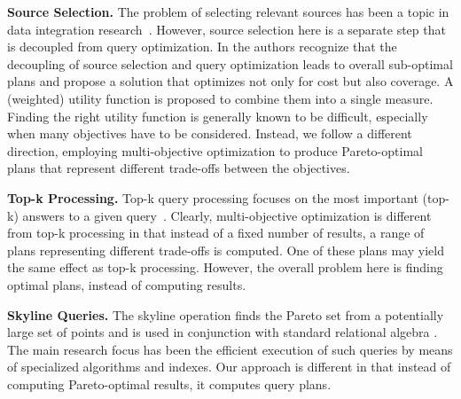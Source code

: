 \textbf{Source Selection.} The problem of selecting relevant sources
has been a topic in data integration research~\cite{levy_querying_1996}. 
However, 
source selection here is a separate step that is decoupled from query
optimization. In \cite{nie_joint_2001} the authors recognize that the decoupling of
source selection and query optimization leads to overall sub-optimal
plans and propose a solution that optimizes not only for cost but
also coverage. A (weighted) utility function is proposed to combine them 
into a single measure. 
Finding the right utility function is generally known to be difficult, especially when many objectives have to be considered. Instead, we follow a different direction, employing multi-objective optimization to produce Pareto-optimal plans that represent different trade-offs between the objectives.

\textbf{Top-k Processing.} Top-k query processing focuses on the most important (top-k) answers to a
given query~\cite{ilyas_survey_2008}. 
Clearly, multi-objective optimization is different from top-k
processing in that instead of a fixed number of results, a range of
plans representing different trade-offs is computed. One of these
plans may yield the same effect as top-k processing. However, the
overall problem here is finding optimal plans, instead of computing
results.

\textbf{Skyline Queries.} The skyline operation finds the Pareto
set from a potentially large set of points and is used in conjunction
with standard relational algebra \cite{boerzsoenyi_skyline_2001}. The
main research focus has been the efficient execution of such queries
by means of specialized algorithms and indexes. Our approach is
different in that instead of computing Pareto-optimal results, it computes query plans.

